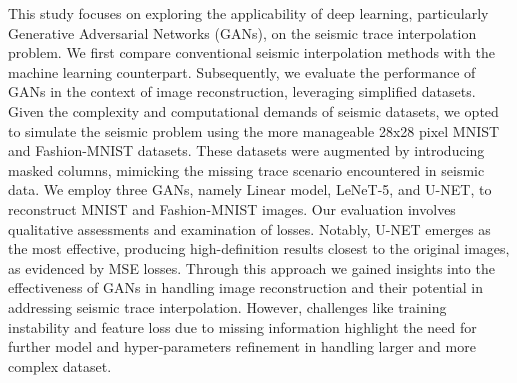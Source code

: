 This study focuses on exploring the applicability of deep learning, particularly Generative Adversarial Networks (GANs), on the seismic trace interpolation problem. We first compare conventional seismic interpolation methods with the machine learning counterpart. Subsequently, we evaluate the performance of GANs in the context of image reconstruction, leveraging simplified datasets. Given the complexity and computational demands of seismic datasets, we opted to simulate the seismic problem using the more manageable 28x28 pixel MNIST and Fashion-MNIST datasets. These datasets were augmented by introducing masked columns, mimicking the missing trace scenario encountered in seismic data. We employ three GANs, namely Linear model, LeNeT-5, and U-NET, to reconstruct MNIST and Fashion-MNIST images. Our evaluation involves qualitative assessments and examination of losses. Notably, U-NET emerges as the most effective, producing high-definition results closest to the original images, as evidenced by MSE losses. Through this approach we gained insights into the effectiveness of GANs in handling image reconstruction and their potential in addressing seismic trace interpolation. However, challenges like training instability and feature loss due to missing information highlight the need for further model and hyper-parameters refinement in handling larger and more complex dataset.
\\\\